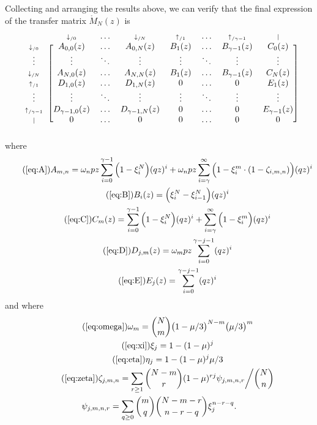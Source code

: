 \documentclass{article}
\newcommand{\dn}[1]{\scriptstyle{\downarrow_{/#1}}}
\newcommand{\up}[1]{\scriptstyle{\uparrow_{/#1}}}
\newcommand{\nd}{\scriptstyle{|}}
\begin{document}
Collecting and arranging the results above, we can verify that the final
expression of the transfer matrix $\mathring{M}_N(z)$ is
\begin{equation*}
\begin{blockarray}{cccccccc}
   & \dn{0} & \ldots & \dn{N} & \up{1} & \ldots & \up{\gamma-1} & \nd \\
\begin{block}{c[ccccccc]}
\dn{0} & A_{0,0}(z) & \ldots & A_{0,N}(z) & B_1(z) & \ldots &
    B_{\gamma-1}(z) & C_0(z) \\
\vdots & \vdots & \ddots & \vdots & \vdots & \ddots &
    \vdots & \vdots \\
\dn{N} & A_{N,0}(z) & \ldots & A_{N,N}(z) & B_1(z) & \ldots &
    B_{\gamma-1}(z) & C_N(z) \\
\up{1} & D_{1,0}(z) & \ldots & D_{1,N}(z) & 0 & \ldots & 0 & E_1(z) \\
\vdots & \vdots & \ddots & \vdots & \vdots & \ddots &
    \vdots & \vdots \\
\up{\gamma-1} & D_{\gamma-1,0}(z) & \ldots & D_{\gamma-1,N}(z) & 0 &
  \ldots & 0 & E_{\gamma-1}(z) \\
\nd & 0 & \ldots & 0 & 0 & \ldots & 0 & 0 \\
\end{block}
\end{blockarray}
\end{equation*}
where
\begin{gather}
\tag{\ref{eq:A}}
A_{m,n} =
\omega_n pz \sum_{i=0}^{\gamma-1} \Big(1 - \xi_i^N \Big) (qz)^i + \omega_n
pz \sum_{i=\gamma}^\infty \Big(1 - \xi_i^m \cdot
(1- \zeta_{i,m,n}) \Big) (qz)^i \\
\tag{\ref{eq:B}}
B_i(z) = \Big( \xi_i^N-\xi_{i-1}^N \Big) (qz)^i \\
\tag{\ref{eq:C}}
C_m(z) =
\sum_{i=0}^{\gamma-1} \Big(1 - \xi_i^N \Big) (qz)^i +
  \sum_{i=\gamma}^\infty \Big(1 - \xi_i^m \Big) (qz)^i \\
\tag{\ref{eq:D}}
D_{j,m}(z) = \omega_m pz \sum_{i=0}^{\gamma-j-1} (qz)^i \\
\tag{\ref{eq:E}}
E_j(z) = \sum_{i=0}^{\gamma-j-1} (qz)^i
\end{gather}
and where
\begin{gather}
\tag{\ref{eq:omega}}
\omega_m = {N \choose m} \big(1 - \mu/3\big)^{N-m} \big(\mu/3\big)^m \\
\tag{\ref{eq:xi}}
\xi_j = 1-(1-\mu)^j \\
\tag{\ref{eq:eta}}
\eta_j = 1-(1-\mu)^j\mu/3 \\
\tag{\ref{eq:zeta}}
\zeta_{j,m,n} = \sum_{r\geq1} {N-m \choose r}
(1-\mu)^{rj} \psi_{j,m,n,r} \bigg/ {N \choose n} \\
\notag
\psi_{j,m,n,r} = \sum_{q \geq 0}{m \choose q}{N-m-r \choose n-r-q}
\xi_j^{n-r-q}.
\end{gather}
\end{document}
